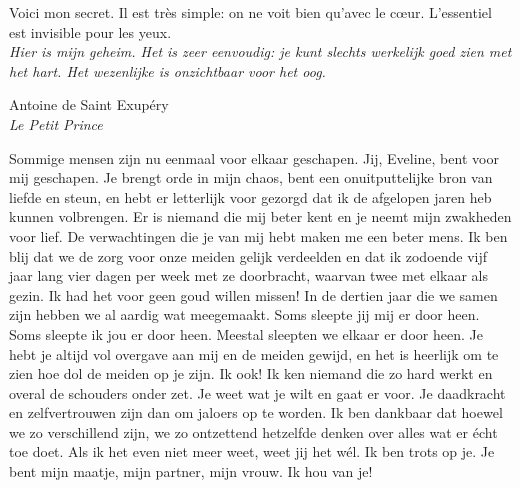 \renewcommand{\epigraphflush}{flushright}
\epigraph{Voici mon secret. Il est très simple: on ne voit bien qu'avec le
cœur. L'essentiel est invisible pour les yeux.\\[1em]
\textit{Hier is mijn geheim.  Het is zeer eenvoudig: je kunt slechts
werkelijk goed zien met het hart.  Het wezenlijke is onzichtbaar voor het
oog.}}
{Antoine de Saint Exupéry\\
\textit{Le Petit Prince}}

\noindent Sommige mensen zijn nu eenmaal voor elkaar geschapen.  Jij,
Eveline, bent voor mij geschapen.  Je brengt orde in mijn chaos, bent een
onuitputtelijke bron van liefde en steun, en hebt er letterlijk voor
gezorgd dat ik de afgelopen jaren heb kunnen volbrengen.  Er is niemand
die mij beter kent en je neemt mijn zwakheden voor lief.  De verwachtingen
die je van mij hebt maken me een beter mens.  Ik ben blij dat we de zorg
voor onze meiden gelijk verdeelden en dat ik zodoende vijf jaar lang vier
dagen per week met ze doorbracht, waarvan twee met elkaar als gezin.  Ik
had het voor geen goud willen missen!  In de dertien jaar die we samen
zijn hebben we al aardig wat meegemaakt.  Soms sleepte jij mij er door
heen.  Soms sleepte ik jou er door heen.  Meestal sleepten we elkaar er
door heen.  Je hebt je altijd vol overgave aan mij en de meiden gewijd, en
het is heerlijk om te zien hoe dol de meiden op je zijn.  Ik ook!  Ik ken
niemand die zo hard werkt en overal de schouders onder zet.  Je weet wat
je wilt en gaat er voor.  Je daadkracht en zelfvertrouwen zijn dan om
jaloers op te worden.  Ik ben dankbaar dat hoewel we zo verschillend zijn,
we zo ontzettend hetzelfde denken over alles wat er écht toe doet.  Als ik
het even niet meer weet, weet jij het wél.  Ik ben trots op je.  Je bent
mijn maatje, mijn partner, mijn vrouw.  Ik hou van je!
